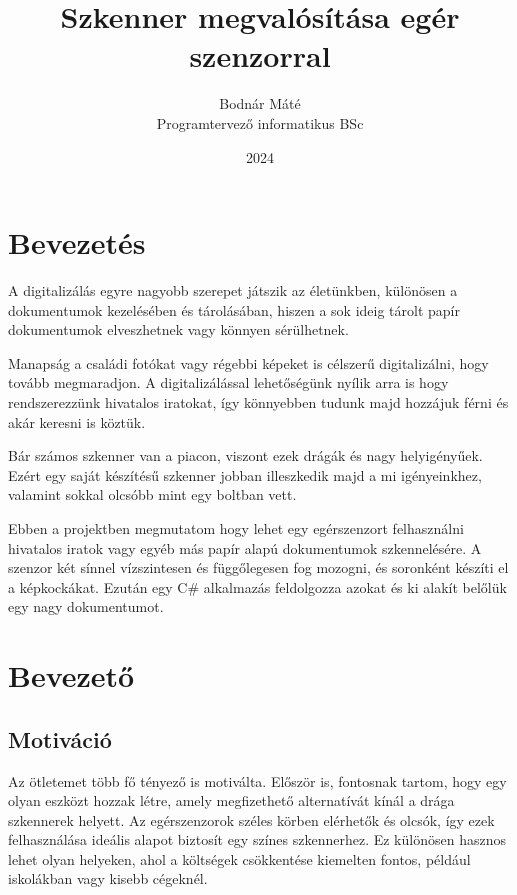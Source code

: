 \documentclass[]{thesis-ekf}
\theoremstyle{definition}
\theoremstyle{remark}
\begin{document}
\title{Szkenner megvalósítása egér szenzorral}
\author{Bodnár Máté\\Programtervező informatikus BSc}
\date{2024}
\maketitle

\tableofcontents

\chapter*{Bevezetés}
A digitalizálás egyre nagyobb szerepet játszik az életünkben, különösen a dokumentumok kezelésében és tárolásában, hiszen a sok ideig tárolt papír dokumentumok elveszhetnek vagy könnyen sérülhetnek.

Manapság a családi fotókat vagy régebbi képeket is célszerű digitalizálni, hogy tovább megmaradjon. A digitalizálással lehetőségünk nyílik arra is hogy rendszerezzünk hivatalos iratokat, így könnyebben tudunk majd hozzájuk férni és akár keresni is köztük. 

Bár számos szkenner van a piacon, viszont ezek drágák és nagy helyigényűek. Ezért egy saját készítésű szkenner jobban illeszkedik majd a mi igényeinkhez, valamint sokkal olcsóbb mint egy boltban vett. 

Ebben a projektben megmutatom hogy lehet egy egérszenzort felhasználni hivatalos iratok vagy egyéb más papír alapú dokumentumok szkennelésére. A szenzor két sínnel vízszintesen és függőlegesen fog mozogni, és soronként készíti el a képkockákat. Ezután egy C\# alkalmazás feldolgozza azokat és ki alakít belőlük egy nagy dokumentumot.

\chapter{Bevezető}

\section{Motiváció}
Az ötletemet több fő tényező is motiválta. Először is, fontosnak tartom, hogy egy olyan eszközt hozzak létre, amely megfizethető alternatívát kínál a drága szkennerek helyett. Az egérszenzorok széles körben elérhetők és olcsók, így ezek felhasználása ideális alapot biztosít egy színes szkennerhez. Ez különösen hasznos lehet olyan helyeken, ahol a költségek csökkentése kiemelten fontos, például iskolákban vagy kisebb cégeknél.
\end{document}
